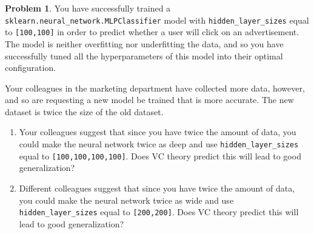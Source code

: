 \documentclass[10pt]{exam}
\theoremstyle{definition}
\newtheorem{problem}{Problem}
\begin{document}
\newpage
\begin{problem}
    You have successfully trained a \lstinline{sklearn.neural_network.MLPClassifier} model with \lstinline{hidden_layer_sizes} equal to \lstinline{[100,100]} in order to predict whether a user will click on an advertisement.
    The model is neither overfitting nor underfitting the data,
    and so you have successfully tuned all the hyperparameters of this model into their optimal configuration.

    Your colleagues in the marketing department have collected more data, however, and so are requesting a new model be trained that is more accurate.
    The new dataset is twice the size of the old dataset.

    \begin{enumerate}
        \item Your colleagues suggest that since you have twice the amount of data, you could make the neural network twice as deep and use \lstinline{hidden_layer_sizes} equal to \lstinline{[100,100,100,100]}.
            Does VC theory predict this will lead to good generalization?

            \vspace{4in}
        \item Different colleagues suggest that since you have twice the amount of data, you could make the neural network twice as wide and use \lstinline{hidden_layer_sizes} equal to \lstinline{[200,200]}.
            Does VC theory predict this will lead to good generalization?
    \end{enumerate}
\end{problem}
\end{document}
